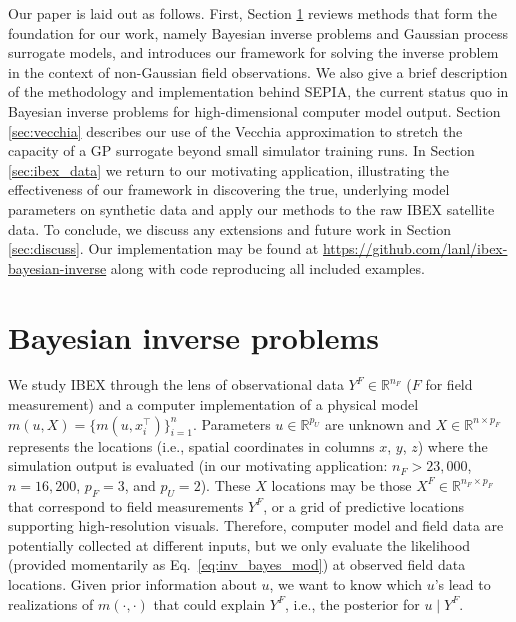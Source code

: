 \documentclass[11pt]{article}
\begin{document}
Our paper is laid out as follows. First, Section \ref{sec:review} reviews
methods that form the foundation for our work, namely Bayesian inverse problems
and Gaussian process surrogate models, and introduces our framework for solving
the inverse problem in the context of non-Gaussian field observations. We also
give a brief description of the methodology and implementation behind SEPIA,
the current status quo in Bayesian inverse problems for high-dimensional
computer model output. Section \ref{sec:vecchia} describes our use of the
Vecchia approximation to stretch the capacity of a GP surrogate beyond small
simulator training runs. In Section \ref{sec:ibex_data} we return to our
motivating application, illustrating the effectiveness of our framework in
discovering the true, underlying model parameters on synthetic data and apply
our methods to the raw IBEX satellite data. To conclude, we discuss any
extensions and future work in Section \ref{sec:discuss}. Our implementation may
be found at \url{https://github.com/lanl/ibex-bayesian-inverse} along with code
reproducing all included examples.



\section{Bayesian inverse problems}
\label{sec:review}

We study IBEX through the lens of observational data {\color{red}$Y^F \in
\mathbb{R}^{n_F}$} ($F$ for field measurement) and a computer
implementation of a physical model $m(u, X) = \{m(u, x_i^\top)\}_{i=1}^n$.
Parameters {\color{red}$u
\in \mathbb{R}^{p_U}$} are unknown and {\color{red} $X \in \mathbb{R}^{n
\times p_F}$} represents the {\color{red} locations (i.e., spatial coordinates
in columns $x$, $y$, $z$)} where the simulation output is evaluated
{\color{red}(in our motivating application: $n_F > 23,000$, $n = 16,200$,
$p_F=3$, and $p_U = 2$)}. These {\color{red}$X$ locations} may be those
{\color{red} $X^F \in
\mathbb{R}^{n_F \times p_F}$ } that correspond to field measurements $Y^F$, or
a grid of predictive locations supporting high-resolution visuals.
{\color{red}Therefore, computer model and field data are potentially collected
at different inputs, but we only evaluate the likelihood (provided momentarily
as Eq.~\ref{eq:inv_bayes_mod}) at observed field data locations.} Given prior
information about $u$, we want to know which $u$'s lead to realizations of
$m(\cdot, \cdot)$ that could explain $Y^F$, i.e., the posterior for $u \mid
Y^F$.
\end{document}
